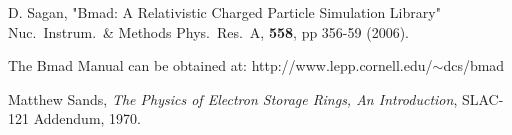 \documentclass[11pt]{article}
\begin{document}
\begin{thebibliography}{9}

D. Sagan,
"Bmad: A Relativistic Charged Particle Simulation Library"
Nuc.\ Instrum.\ \& Methods Phys.\ Res.\ A, {\bf 558}, pp 356-59 (2006).

The Bmad Manual can be obtained at:\hfill\break
\hspace*{20pt} http://www.lepp.cornell.edu/$\scriptstyle\sim$dcs/bmad

Matthew Sands, {\em The Physics of Electron Storage Rings, An Introduction},
SLAC-121 Addendum, 1970.

\end{thebibliography}
\end{document}
